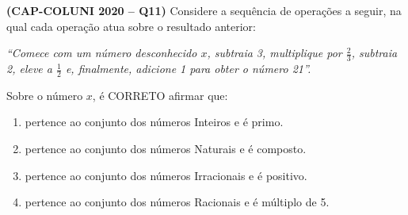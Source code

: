 \textbf{(CAP-COLUNI 2020 -- Q11)} Considere a sequência de operações a seguir, na qual cada operação atua sobre o resultado anterior:

\textit{``Comece com um número desconhecido $x$, subtraia 3, multiplique por $\frac{2}{3}$, subtraia 2, eleve a $\frac{1}{2}$ e, finalmente, adicione 1 para obter o número 21''.}

Sobre o número $x$, é CORRETO afirmar que:

\begin{enumerate}
	\item pertence ao conjunto dos números Inteiros e é primo.
	\item pertence ao conjunto dos números Naturais e é composto.
	\item pertence ao conjunto dos números Irracionais e é positivo.
	\item pertence ao conjunto dos números Racionais e é múltiplo de 5.
\end{enumerate}
